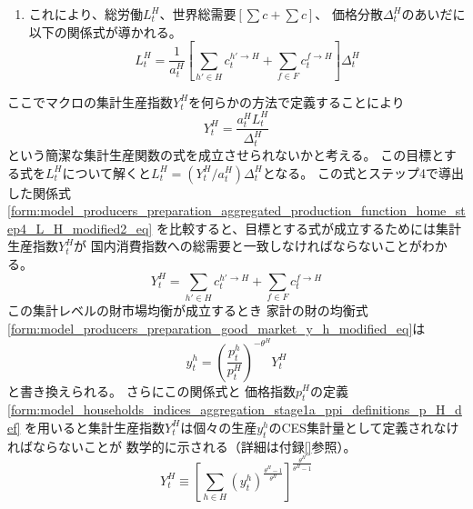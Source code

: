 \begin{enumerate}
\begin{equation}
        \end{equation}
    \item
    \label{itm:model_producers_preparation_aggregated_production_function_home_step4}
        これにより、総労働\(L_t^H\)、世界総需要\([\sum c+\sum c]\)、
        価格分散\(\Delta_t^H\)のあいだに以下の関係式が導かれる。
        \begin{equation}
        \label{form:model_producers_preparation_aggregated_production_function_home_step4_L_H_modified2_eq}
            L_t^H=\frac{1}{a_t^H}\left[\sum_{h'\in H}c_t^{h'\to H}+\sum_{f\in F}c_t^{f\to H}\right]\Delta_t^H
        \end{equation}
\end{enumerate}

ここでマクロの集計生産指数\(Y_t^H\)を何らかの方法で定義することにより
\begin{equation}
\label{form:model_producers_preparation_aggregated_production_function_home_Y_H_assumption_eq}
    Y_t^H=\frac{a_t^HL_t^H}{\Delta_t^H}
\end{equation}
という簡潔な集計生産関数の式を成立させられないかと考える。
この目標とする式を\(L_t^H\)について解くと\(L_t^H=(Y_t^H/a_t^H)\Delta_t^H\)となる。
この式とステップ4で導出した関係式
\eqref{form:model_producers_preparation_aggregated_production_function_home_step4_L_H_modified2_eq}
を比較すると、目標とする式が成立するためには集計生産指数\(Y_t^H\)が
国内消費指数への総需要と一致しなければならないことがわかる。
\begin{equation}
\label{form:model_producers_preparation_aggregated_production_function_home_Y_H_assumption_modified_eq}
    Y_t^H=\sum_{h'\in H}c_t^{h'\to H}+\sum_{f\in F}c_t^{f\to H}
\end{equation}
この集計レベルの財市場均衡が成立するとき
家計の財の均衡式\eqref{form:model_producers_preparation_good_market_y_h_modified_eq}は
\begin{equation}
\label{form:model_producers_preparation_aggregated_production_function_home_Y_H_assumption_y_h_eq}
    y_t^h=\left(\frac{p_t^h}{p_t^H}\right)^{-\theta^H}Y_t^H
\end{equation}
と書き換えられる。
さらにこの関係式と
価格指数\(p_t^H\)の定義
\eqref{form:model_households_indices_aggregation_stage1a_ppi_definitions_p_H_def}
を用いると集計生産指数\(Y_t^H\)は個々の生産\(y_t^h\)のCES集計量として定義されなければならないことが
数学的に示される（詳細は付録\ref{}参照）。
\begin{equation}
\label{form:model_producers_preparation_aggregated_production_function_home_Y_H_assumption_modified2_eq}
    Y_t^H\equiv\left[\sum_{h\in H}(y_t^h)^{\frac{\theta^H-1}{\theta^H}}\right]^{\frac{\theta^H}{\theta^H-1}}
\end{equation}

